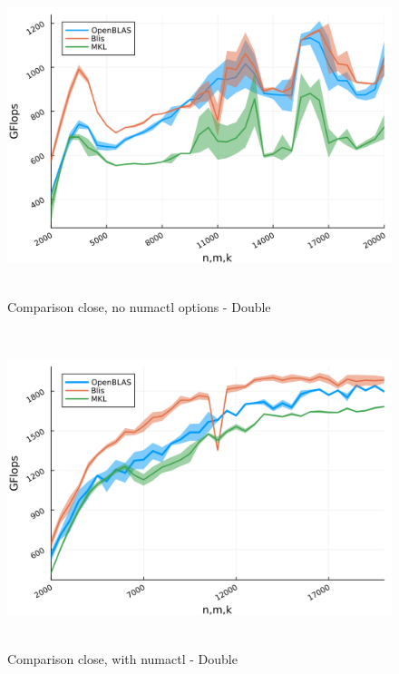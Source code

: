 \documentclass[
  letterpaper,
  DIV=11,
  numbers=noendperiod]{scrartcl}
\begin{document}
\begin{figure}

{\centering \includegraphics[width=\textwidth,height=3.64583in]{img/double_close_comparison.png}

}

\caption{Comparison close, no numactl options - Double}

\end{figure}

\begin{figure}

{\centering \includegraphics[width=\textwidth,height=3.64583in]{img/double_numactl_close_comparison.png}

}

\caption{Comparison close, with numactl - Double}

\end{figure}
\end{document}
